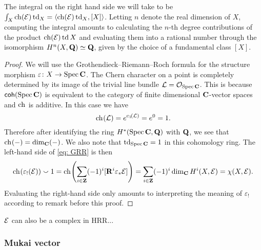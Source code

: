 
\begin{remark}
    The integral on the right hand side we will take to be $\int_X \ch{\E}\tdclass{X} = \pairing{\ch{\E}\tdclass{X}}{[X]}$. 
    Letting $n$ denote the real dimension of $X$, computing the integral amounts to calculating the $n$-th degree contributions of the product $\ch{\E}\td{X}$ and evaluating them into a rational number through the isomorphism $H^{n}(X, \mathbf Q) \simeq \mathbf Q$, given by the choice of a fundamental class $[X]$.
\end{remark}

\begin{proof}
    We will use the Grothendieck--Riemann--Roch formula for the structure morphism $\varepsilon \colon X \to \operatorname{Spec}\mathbf C$. The Chern character on a point is completely determined by its image of the trivial line bundle $\mathcal L = {\mathcal{O}_{\operatorname{Spec}\mathbf C}}$. This is because $\mathsf{coh}(\operatorname{Spec}\mathbf C)$ is equivalent to the category of finite dimensional $\mathbf C$-vector spaces and $\ch[]$ is additive. In this case we have
    \[
        \ch[]{\mathcal L} = e^{\cclass[1]{\mathcal L}} = e^0 = 1.
    \]
    Therefore after identifying the ring $H^{*}(\operatorname{Spec}\mathbf C, \mathbf Q)$ with $\mathbf Q$, we see that $\ch[](-) = \dim_\C(-)$. We also note that $\operatorname{td}_{\operatorname{Spec}\mathbf C} = 1$ in this cohomology ring. The left-hand side of \eqref{eq: GRR} is then
    \[
        \ch[]{\varepsilon_!(\E)}\smallsmile 1 = \ch[]{\sum_{i \in \Z}(-1)^i[\rderived{i}{\varepsilon_*}\E]} = \sum_{i\in \Z}(-1)^i\dim_\C\cohom{i}{X}{\E} = \chi(X, \E).
    \]  
    Evaluating the right-hand side only amounts to interpreting the meaning of $\varepsilon_!$ according to remark before this proof.
\end{proof}

\begin{remark}
    $\mathcal E$ can also be a complex in HRR...
\end{remark}

\subsubsection*{Mukai vector}

